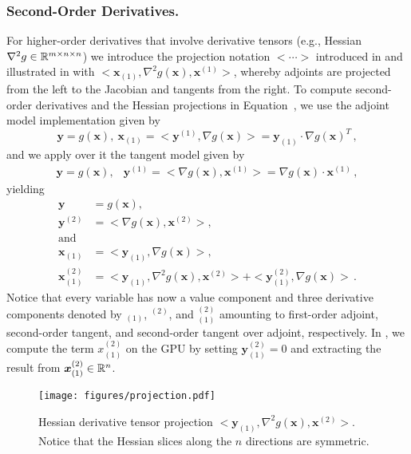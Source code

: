 \subsubsection{Second-Order Derivatives.}
\label{sec:so:ad}
For higher-order derivatives that involve derivative tensors (e.g.,
Hessian $\nabla^2 g \in \mathbb{R}^{m \times n \times n}$) we introduce the projection notation $<\cdots>$ introduced in
\cite{naumann2012art} and illustrated in  with
$<\bm{x}_{(1)}, \nabla^2 g(\bm{x}), \bm{x}^{(1)}>$, whereby adjoints are
projected from the left to the Jacobian and tangents from the right.
To compute second-order derivatives and the Hessian projections in
Equation~, we use the adjoint model implementation given by
\begin{equation}
  \bm{y}=g(\bm{x}),\
  \bm{x}_{(1)} = < \bm{y}^{(1)}, \nabla g(\bm{x})> = \bm{y}_{(1)} \cdot \nabla
  g(\bm{x})^T  \,,
  \label{eq:adjoint}
\end{equation}
and we apply over it the tangent model given by
\begin{equation}
\begin{array}{llll}
  \bm{y}=g(\bm{x}), &
  \bm{y}^{(1)} = < \nabla g(\bm{x}), \bm{x}^{(1)}> = \nabla
  g(\bm{x}) \cdot \bm{x}^{(1)} \,,
  \label{eq:tlm}
\end{array}
\end{equation}
yielding
\begin{equation}
\begin{array}{llll}
  \bm{y}&=g(\bm{x}), \\
  \bm{y}^{(2)}&=< \nabla g(\bm{x}), \bm{x}^{(2)}>, \\
  \text{and} \\
  \bm{x}_{(1)}& = < \bm{y}_{(1)}, \nabla g(\bm{x})>, \\
  \bm{x}^{(2)}_{(1)} &= <\bm{y}_{(1)}, \nabla^2 g(\bm{x}), \bm{x}^{(2)}> +
  <\bm{y}^{(2)}_{(1)}, \nabla g(\bm{x})>\,.
\end{array}
\label{eq:so_model}
\end{equation}
Notice that every variable has now a value component and three
derivative components denoted by $_{(1)}$, $^{(2)}$, and $^{(2)}_{(1)}$
amounting to first-order adjoint, second-order tangent, and second-order
tangent over adjoint, respectively. In  \refsec{sec:reduction:algorithm}, we  compute
the term $x_{(1)}^{(2)}$ on the GPU
by setting $\bm{y}_{(1)}^{(2)} = 0$ and extracting the result from $\bm{x}_{(1)}^{(2)} \in \mathbb{R}^n$.

\begin{figure}
  \centering
\texttt{[image: figures/projection.pdf]}
\caption{Hessian derivative tensor projection $<\bm{y}_{(1)}, \nabla^2 g(\bm{x}), \bm{x}^{(2)}>$. Notice that the Hessian slices along the $n$ directions are symmetric.}
\label{fig:hessianprojection}
\end{figure}


